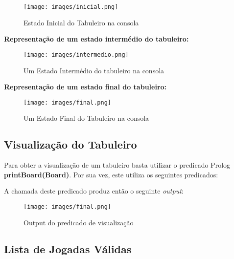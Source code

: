 \documentclass[a4paper]{article}
\begin{document}
\begin{figure}[H]
	\centering
	\texttt{[image: images/inicial.png]}
	\caption{Estado Inicial do Tabuleiro na consola}
	\label{fig:estado_inicial}
\end{figure}
\newpage

\textbf{Representação de um estado intermédio do tabuleiro:}
\linebreak


\begin{figure}[H]
	\centering
	\texttt{[image: images/intermedio.png]}
	\caption{Um Estado Intermédio do tabuleiro na consola}
	\label{fig:estado_intermedio}
\end{figure}
\newpage
\textbf{Representação de um estado final do tabuleiro:}
\linebreak


\begin{figure}[H]
	\centering
	\texttt{[image: images/final.png]}
	\caption{Um Estado Final do Tabuleiro na consola}
	\label{fig:estado_final}
\end{figure}

\newpage

\subsection{Visualização do Tabuleiro} 

Para obter a visualização de um tabuleiro basta utilizar o predicado Prolog  \textbf{printBoard(Board)}. Por sua vez, este utiliza os seguintes predicados: 


A chamada deste predicado produz então o seguinte  \textit{output}:
\begin{figure}[H]
    \centering
    \texttt{[image: images/final.png]}
    \caption{Output do predicado de visualização}
    \label{fig:final_board}
\end{figure}

\subsection{Lista de Jogadas Válidas} 
\end{document}
